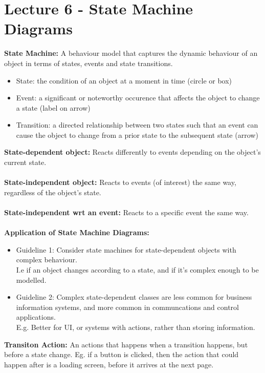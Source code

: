\documentclass[a4paper,10pt]{article}
\begin{document}
\section*{Lecture 6 - State Machine Diagrams}
\textcolor{Cerulean}{\textbf{State Machine:}} A behaviour model that captures the dynamic behaviour of an object in terms of states, events and state transitions.\\
\renewcommand{\labelitemi}{\textperiodcentered}
\begin{itemize}
\item \textcolor{Cerulean}{State:} the condition of an object at a moment in time (circle or box)
\item \textcolor{Cerulean}{Event:} a significant or noteworthy occurence that affects the object to change a state (label on arrow)
\item \textcolor{Cerulean}{Transition:} a directed relationship between two states such that an event can cause the object to change from a prior state to the subsequent state (arrow)
\end{itemize}
\textcolor{Cerulean}{\textbf{State-dependent object:}} Reacts differently to events depending on the object's current state. \\\\
\textcolor{Cerulean}{\textbf{State-independent object:}} Reacts to events (of interest) the same way, regardless of the object's state.\\\\
\textcolor{Cerulean}{\textbf{State-independent wrt an event:}} Reacts to a specific event the same way. \\\\
\textcolor{Cerulean}{\textbf{Application of State Machine Diagrams:}}
\renewcommand{\labelitemi}{\textperiodcentered}
\begin{itemize}
\item \textcolor{Cerulean}{Guideline 1:} Consider state machines for state-dependent objects with complex behaviour. \\
I.e if an object changes according to a state, and if it's complex enough to be modelled. 
\item \textcolor{Cerulean}{Guideline 2:} Complex state-dependent classes are less common for business information systems, and more common in communcations and control applications.\\
E.g. Better for UI, or systems with actions, rather than storing information. 
\end{itemize}
\textcolor{Cerulean}{\textbf{Transiton Action:}} An actions that happens when a transition happens, but before a state change. Eg. if a button is clicked, then the action that could happen after is a loading screen, before it arrives at the next page.\\\\
\end{document}
